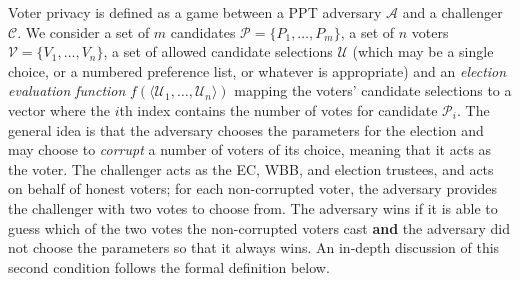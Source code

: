 \documentclass[12pt,a4paper]{article}
\theoremstyle{definition}
\begin{document}
Voter privacy is defined as a game between a PPT adversary $\mathcal{A}$ and a challenger $\mathcal{C}$. We consider a set of $m$ candidates $\mathcal{P}=\{P_1,\ldots,P_m\}$, a set of $n$ voters $\mathcal{V}=\{V_1,\ldots,V_n\}$, a set of allowed candidate selections $\mathcal{U}$ (which may be a single choice, or a numbered preference list, or whatever is appropriate) and an \textit{election evaluation function} $f(\langle \mathcal{U}_1,\ldots,\mathcal{U}_n \rangle)$ mapping the voters' candidate selections to a vector where the $i$th index contains the number of votes for candidate $\mathcal{P}_i$. The general idea is that the adversary chooses the parameters for the election and may choose to \textit{corrupt} a number of voters of its choice, meaning that it acts as the voter. The challenger acts as the EC, WBB, and election trustees, and acts on behalf of honest voters; for each non-corrupted voter, the adversary provides the challenger with two votes to choose from. The adversary wins if it is able to guess which of the two votes the non-corrupted voters cast \textbf{and} the adversary did not choose the parameters so that it always wins. An in-depth discussion of this second condition follows the formal definition below.
\end{document}

